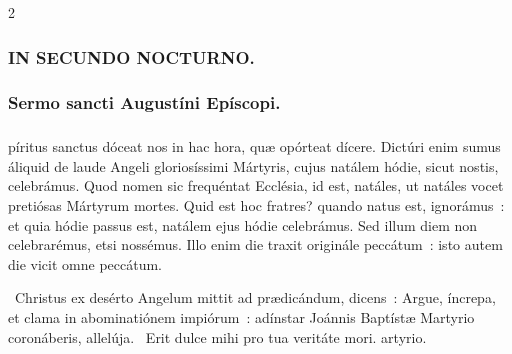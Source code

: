 \documentclass[9pt,twoside]{extarticle}
\begin{document}
\begin{multicols}{2}
{{\subsubsection*{\center {}}
\begin{tightlist}{}
\item {}
\item {}
\item {}
\end{tightlist}

\subsubsection*{\center \textsc{IN SECUNDO NOCTURNO.}}
\subsubsection*{\center Sermo sancti Augustíni Epíscopi.}
\subsubsection*{\center {}}
píritus sanctus dóceat nos in hac hora, quæ opórteat dícere. Dictúri enim sumus áliquid de laude Angeli gloriosíssimi Mártyris, cujus natálem hódie, sicut nostis, celebrámus. Quod nomen sic frequéntat Ecclésia, id est, natáles, ut natáles vocet pretiósas Mártyrum mortes. Quid est hoc fratres? quando natus est, ignorámus~: et quia hódie passus est, natálem ejus hódie celebrámus. Sed illum diem non celebrarémus, etsi nossémus. Illo enim die traxit originále peccátum~: isto autem die vicit omne peccátum.

\begin{tightlist}{}
\item {}~Christus ex desérto Angelum mittit ad prædicándum, dicens~: Argue, íncrepa, et clama in abominatiónem impiórum~: adínstar Joánnis Baptístæ \textred{*} Martyrio coronáberis, allelúja. ~Erit dulce mihi pro tua veritáte mori. artyrio.
\end{tightlist}

}}
\end{multicols}
\end{document}

